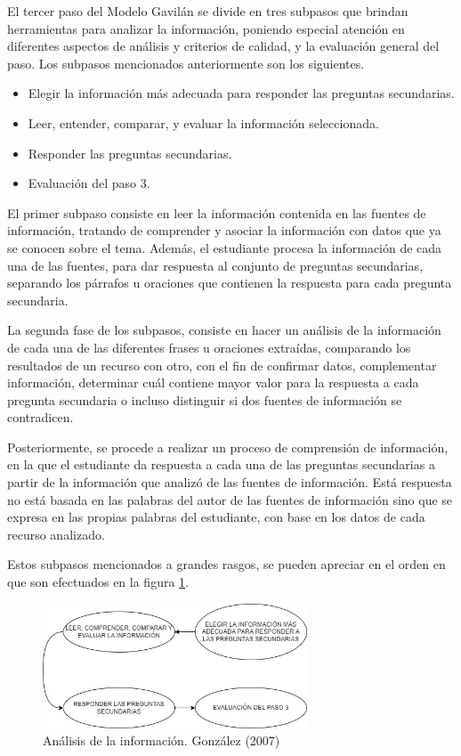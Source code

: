 El tercer paso del Modelo Gavilán se divide en tres subpasos que brindan herramientas para analizar la información, poniendo especial atención en diferentes aspectos de análisis y criterios de calidad, y la evaluación general del paso. Los subpasos mencionados anteriormente son los siguientes.

\begin{itemize}
  \item Elegir la información más adecuada para responder las preguntas secundarias.
  \item Leer, entender, comparar, y evaluar la información seleccionada.
  \item Responder las preguntas secundarias.
  \item Evaluación del paso 3.
\end{itemize}

El primer subpaso consiste en leer la información contenida en las fuentes de información, tratando de comprender y asociar la información con datos que ya se conocen sobre el tema. Además, el estudiante procesa la información de cada una de las fuentes, para dar respuesta al conjunto de preguntas secundarias, separando los párrafos u oraciones que contienen la respuesta para cada pregunta secundaria.

La segunda fase de los subpasos, consiste en hacer un análisis de la información de cada una de las diferentes frases u oraciones extraídas, comparando los resultados de un recurso con otro, con el fin de confirmar datos, complementar información, determinar cuál contiene mayor valor para la respuesta a cada pregunta secundaria o incluso distinguir si dos fuentes de información se contradicen.

Posteriormente, se procede a realizar un proceso de comprensión de información, en la que el estudiante da respuesta a cada una de las preguntas secundarias a partir de la información que analizó de las fuentes de información. Está respuesta no está basada en las palabras del autor de las fuentes de información sino que se expresa en las propias palabras del estudiante, con base en los datos de cada recurso analizado.

Estos subpasos mencionados a grandes rasgos, se pueden apreciar en el orden en que son efectuados en la figura \ref{fig:25}.

\begin{figure}[H]
  \centering
  \includegraphics[width=0.70\textwidth]{Cap2/Figuras/Análisis de la información.jpg}
  \caption{Análisis de la información. González (2007)}
  \label{fig:25}
\end{figure}

